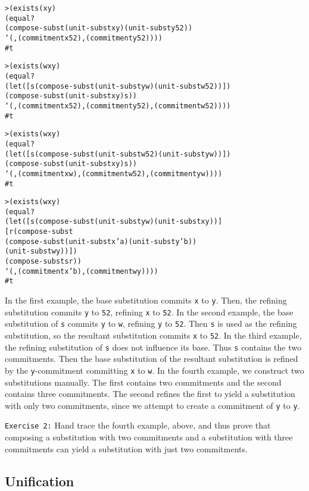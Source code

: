 \begin{alltt}
> (exists (x y)
    (equal?
      (compose-subst (unit-subst x y) (unit-subst y 52))
      `(,(commitment x 52) ,(commitment y 52))))
#t

> (exists (w x y)
    (equal?
      (let ([s (compose-subst (unit-subst y w) (unit-subst w 52))])
        (compose-subst (unit-subst x y) s))
      `(,(commitment x 52) ,(commitment y 52) ,(commitment w 52))))
#t

> (exists (w x y)
    (equal?
      (let ([s (compose-subst (unit-subst w 52) (unit-subst y w))])
        (compose-subst (unit-subst x y) s))
    `(,(commitment x w) ,(commitment w 52) ,(commitment y w))))
#t
\end{alltt}
\newpage
\begin{alltt}
> (exists (w x y)
    (equal?
      (let ([s (compose-subst (unit-subst y w) (unit-subst x y))]
            [r (compose-subst
                 (compose-subst (unit-subst x 'a) (unit-subst y 'b))
                 (unit-subst w y))])
        (compose-subst s r))
      `(,(commitment x 'b) ,(commitment w y))))
#t
\end{alltt}
In the first example, the base substitution commits \texttt{x} to
\texttt{y}.  Then, the refining substitution commits \texttt{y} to
\texttt{52}, refining \texttt{x} to \texttt{52}.  In the second
example, the base substitution of \texttt{s} commits \texttt{y} to
\texttt{w}, refining \texttt{y} to \texttt{52}.  Then \texttt{s} is
used as the refining substitution, so the resultant substitution
commits \texttt{x} to \texttt{52}.  In the third example, the refining
substitution of \texttt{s} does not influence its base.  Thus
\texttt{s} contains the two commitments.  Then the base substitution
of the resultant substitution is refined by the \texttt{y}-commitment committing
\texttt{x} to \texttt{w}.  In the fourth example, we construct two
substitutions manually.  The first contains two commitments and the
second contains three commitments.  The second refines the first to
yield a substitution with only two commitments, since we attempt to
create a commitment of \texttt{y} to \texttt{y}.

\texttt{Exercise 2:} Hand trace the fourth example, above, and
thus prove that composing a substitution with two commitments and
a substitution with three commitments can yield a substitution
with just two commitments.

\subsection{Unification}

